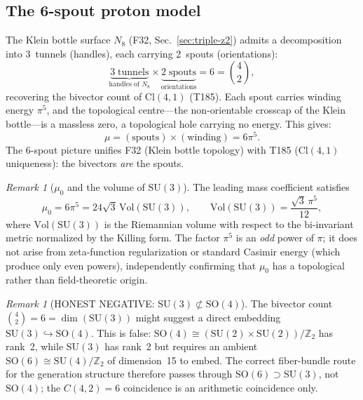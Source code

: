 \documentclass[aps,prd,twocolumn,superscriptaddress,floatfix,nofootinbib]{revtex4-2}
\theoremstyle{definition}
\theoremstyle{remark}
\newtheorem{remark}[theorem]{Remark}
\begin{document}
\subsection{The 6-spout proton model}
\label{sec:6-spout}

The Klein bottle surface $N_8$ (F32, Sec.~\ref{sec:triple-z2}) admits a
decomposition into 3~tunnels (handles), each carrying 2~spouts
(orientations):
\begin{equation}
\underbrace{3\;\text{tunnels}}_{\text{handles of } N_8}
\times
\underbrace{2\;\text{spouts}}_{\text{orientations}}
= 6 = \binom{4}{2},
\end{equation}
recovering the bivector count of $\mathrm{Cl}(4,1)$ (T185).  Each spout
carries winding energy $\pi^5$, and the topological centre---the
non-orientable crosscap of the Klein bottle---is a massless zero, a
topological hole carrying no energy.  This gives:
\begin{equation}
\mu = (\text{spouts}) \times (\text{winding}) = 6\pi^5.
\end{equation}
The 6-spout picture unifies F32 (Klein bottle topology) with T185
($\mathrm{Cl}(4,1)$ uniqueness): the bivectors \emph{are} the spouts.

\begin{remark}[$\mu_0$ and the volume of $\mathrm{SU}(3)$]
\label{rem:vol-su3}
The leading mass coefficient satisfies
\begin{equation}
  \mu_0 = 6\pi^5 = 24\sqrt{3}\,\mathrm{Vol}(\mathrm{SU}(3)),
  \qquad \mathrm{Vol}(\mathrm{SU}(3)) = \frac{\sqrt{3}\,\pi^5}{12},
\end{equation}
where $\mathrm{Vol}(\mathrm{SU}(3))$ is the Riemannian volume with respect to
the bi-invariant metric normalized by the Killing form.  The factor $\pi^5$ is
an \emph{odd} power of $\pi$; it does not arise from zeta-function
regularization or standard Casimir energy (which produce only even powers),
independently confirming that $\mu_0$ has a topological rather than
field-theoretic origin.
\end{remark}

\begin{remark}[HONEST NEGATIVE: $\mathrm{SU}(3) \not\subset \mathrm{SO}(4)$]
\label{rem:su3-not-so4}
The bivector count $\binom{4}{2} = 6 = \dim(\mathrm{SU}(3))$ might suggest a
direct embedding $\mathrm{SU}(3) \hookrightarrow \mathrm{SO}(4)$.  This is false:
$\mathrm{SO}(4) \cong (\mathrm{SU}(2)\times\mathrm{SU}(2))/\mathbb{Z}_2$ has rank~2,
while $\mathrm{SU}(3)$ has rank~2 but requires an ambient $\mathrm{SO}(6) \cong \mathrm{SU}(4)/\mathbb{Z}_2$
of dimension~15 to embed.  The correct fiber-bundle route for the generation
structure therefore passes through $\mathrm{SO}(6) \supset \mathrm{SU}(3)$, not
$\mathrm{SO}(4)$; the $C(4,2) = 6$ coincidence is an arithmetic coincidence only.
\end{remark}
\end{document}
